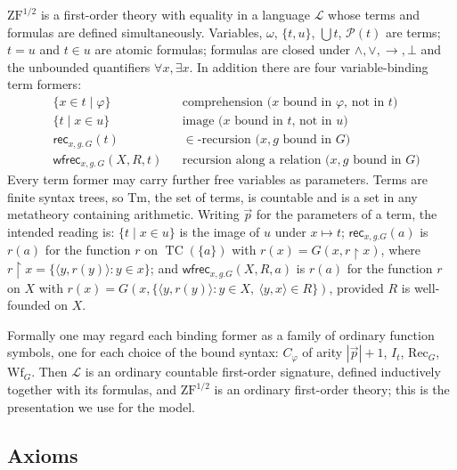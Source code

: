 \documentclass[10pt]{article}
\newcommand{\ZFh}{\mathrm{ZF}^{1/2}}
\newcommand{\TC}{\operatorname{TC}}
\newcommand{\PP}{\mathcal{P}}
\newcommand{\rec}{\mathsf{rec}}
\newcommand{\wfrec}{\mathsf{wfrec}}
\newcommand{\Lang}{\mathcal L}
\newcommand{\Terms}{\mathrm{Tm}}
\begin{document}
$\ZFh$ is a first-order theory with equality in a language $\Lang$ whose
terms and formulas are defined simultaneously. Variables, $\omega$,
$\{t,u\}$, $\bigcup t$, $\PP(t)$ are terms; $t=u$ and $t\in u$ are atomic
formulas; formulas are closed under $\wedge,\vee,\to,\bot$ and the
unbounded quantifiers $\forall x,\exists x$. In addition there are four
variable-binding term formers:
\begin{align*}
&\{x\in t\mid\varphi\} && \text{comprehension ($x$ bound in $\varphi$, not in $t$)}\\
&\{t\mid x\in u\} && \text{image ($x$ bound in $t$, not in $u$)}\\
&\rec_{x,g.\,G}(t) && \text{$\in$-recursion ($x,g$ bound in $G$)}\\
&\wfrec_{x,g.\,G}(X,R,t) && \text{recursion along a relation ($x,g$ bound in $G$)}
\end{align*}
Every term former may carry further free variables as parameters. Terms
are finite syntax trees, so $\Terms$, the set of terms, is countable and
is a set in any metatheory containing arithmetic. Writing $\vec p$ for the
parameters of a term, the intended reading is: $\{t\mid x\in u\}$ is the
image of $u$ under $x\mapsto t$; $\rec_{x,g.G}(a)$ is $r(a)$ for the
function $r$ on $\TC(\{a\})$ with $r(x)=G(x,r{\restriction}x)$, where
$r{\restriction}x=\{\langle y,r(y)\rangle:y\in x\}$; and
$\wfrec_{x,g.G}(X,R,a)$ is $r(a)$ for the function $r$ on $X$ with
$r(x)=G(x,\{\langle y,r(y)\rangle:y\in X,\ \langle y,x\rangle\in R\})$,
provided $R$ is well-founded on $X$.

Formally one may regard each binding former as a family of ordinary
function symbols, one for each choice of the bound syntax: $C_\varphi$ of
arity $|\vec p|+1$, $I_t$, $\mathrm{Rec}_G$, $\mathrm{Wf}_G$. Then $\Lang$ is
an ordinary countable first-order signature, defined inductively together
with its formulas, and $\ZFh$ is an ordinary first-order theory; this is
the presentation we use for the model.

\subsection{Axioms}
\end{document}

